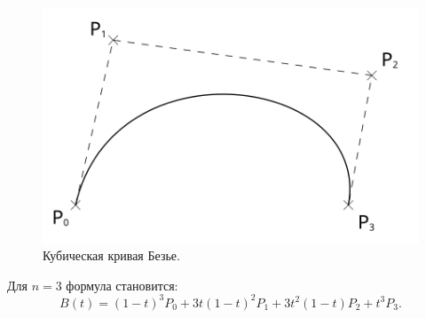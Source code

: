 \begin{figure}[H]
    \begin{center}
        \begin{minipage}[h]{0.4\linewidth}
            \includegraphics[width=1\textwidth]{Bezier_curve.png}
            \caption{Кубическая кривая Безье.}
            \label{ris:curve}
        \end{minipage}
    \end{center}
\end{figure}

Для \(n = 3\) формула становится:
\[
    B(t) = (1-t)^3 P_0 + 3t(1-t)^2  P_1 + 3t^2(1-t) P_2 + t^3 P_3.
\]
